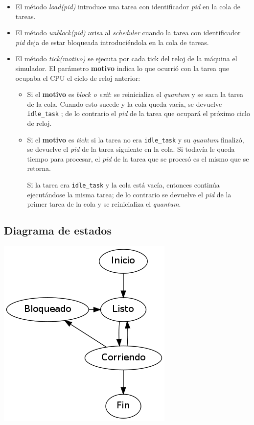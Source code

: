 \begin{itemize}
	\item El método \textit{load(pid)} introduce una tarea con identificador \textit{pid} en la cola de tareas.
	
	\item El método \textit{unblock(pid)} avisa al \textit{scheduler} cuando la tarea con identificador \textit{pid} deja de estar bloqueada introduciéndola en la cola de tareas.
	
	\item El método \textit{tick(motivo)} se ejecuta por cada tick del reloj de la máquina el simulador. El parámetro \textbf{motivo} indica lo que ocurrió con la tarea que ocupaba el CPU el ciclo de reloj anterior:
	
	\begin{itemize}
		\item Si el \textbf{motivo} es \textit{block o exit}: se reinicializa el \textit{quantum} y se saca la tarea de la cola. Cuando esto sucede y la cola queda vacía, se devuelve \verb|idle_task| ; de lo contrario el \textit{pid} de la tarea que ocupará el próximo ciclo de reloj.

		\item Si el \textbf{motivo} es \textit{tick}: si la tarea no era \verb|idle_task| y su \textit{quantum} finalizó, se devuelve el \textit{pid} de la tarea siguiente en la cola. Si todavía le queda tiempo para procesar, el \textit{pid} de la tarea que se procesó es el mismo que se retorna.
		
		Si la tarea era \verb|idle_task| y la cola está vacía, entonces continúa ejecutándose la misma tarea; de lo contrario se devuelve el \textit{pid} de la primer tarea de la cola y se reinicializa el \textit{quantum}.
	\end{itemize}

\end{itemize}

\subsection{Diagrama de estados}

\begin{center}
\includegraphics[scale=0.5]{estados.png}
\end{center}
 
